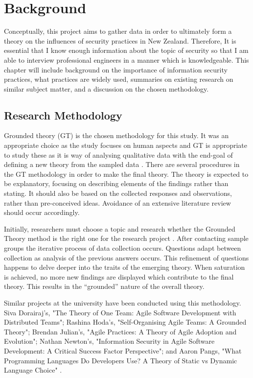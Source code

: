 \chapter{Background}\label{C:Background}

\par Conceptually, this project aims to gather data in order to ultimately form a theory on the influences of security practices in New Zealand. Therefore, It is essential that I know enough information about the topic of security so that I am able to interview professional engineers in a manner which is knowledgeable. This chapter will include background on the importance of information security practices, what practices are widely used, summaries on existing research on similar subject matter, and a discussion on the chosen methodology.  

\section{Research Methodology}

Grounded theory (GT) is the chosen methodology for this study. It was an appropriate choice as the study focuses on human aspects and GT is appropriate to study these as it is way of analysing qualitative data with the end-goal of defining a new theory from the sampled data \cite{geeks}. There are several procedures in the GT  methodology in order to make the final theory.  The theory is expected to be explanatory, focusing on describing elements of the findings rather than stating. It should also be based on the collected responses and observations, rather than pre-conceived ideas. Avoidance of an extensive literature review should occur accordingly.
\newline
\par Initially, researchers must choose a topic and research whether the Grounded Theory method is the right one for the research project \cite{geeks}. After contacting sample groups the iterative process of data collection occurs. Questions adapt between collection as analysis of the previous answers occurs. This refinement of questions happens to delve deeper into the traits of the emerging theory. When saturation is achieved, no more new findings are displayed which contribute to the final theory. This results in the “grounded” nature of the overall theory.
\newline
\par Similar projects at the university have been conducted using this methodology. Siva Dorairaj's, "The Theory of One Team: Agile Software Development with Distributed Teams"; Rashina Hoda's, "Self-Organising Agile Teams: A Grounded Theory"; Brendan Julian's, "Agile Practices: A Theory of Agile Adoption and Evolution"; Nathan Newton's, "Information Security in Agile Software Development: A Critical Success Factor Perspective"; and Aaron Pangs, "What Programming Languages Do Developers Use? A Theory of Static vs Dynamic Language Choice" \cite{alumni}.

